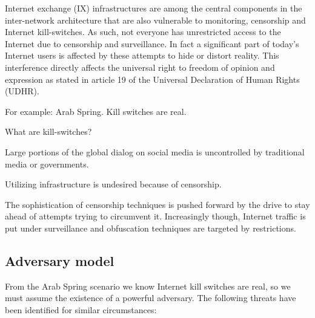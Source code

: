 Internet exchange (IX) infrastructures are among the central components in the inter-network architecture that are also vulnerable to monitoring, censorship and Internet kill-switches.
As such, not everyone has unrestricted access to the Internet due to censorship and surveillance.
In fact a significant part of today's Internet users is affected by these attempts to hide or distort reality. %
This interference directly affects the universal right to freedom of opinion and expression as stated in article 19 of the Universal Declaration of Human Rights (UDHR).


For example: Arab Spring. Kill switches are real. \cite{Egypt left internet}

What are kill-switches?


Large portions of the global dialog on social media is uncontrolled by traditional media or governments.

Utilizing infrastructure is undesired because of censorship.


The sophistication of censorship techniques is pushed forward by the drive to stay ahead of attempts trying to circumvent it.
Increasingly though, Internet traffic is put under surveillance and obfuscation techniques are targeted by restrictions.


\subsection{Adversary model}
From the Arab Spring scenario we know Internet kill switches are real, so we must assume the existence of a powerful adversary.
The following threats \cite{ietf-shadow-internet} have been identified for similar circumstances:

